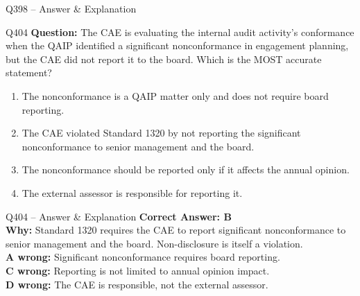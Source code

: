\documentclass[aspectratio=169,10pt]{beamer}
\begin{document}
\begin{frame}[t]{Q398 -- Answer \& Explanation}
	\begin{frame}[t]{Q404}
		\small
		\textbf{Question:} The CAE is evaluating the internal audit activity's conformance when the QAIP identified a significant nonconformance in engagement planning, but the CAE did not report it to the board. Which is the MOST accurate statement?
		\begin{enumerate}[label=\Alph*.,itemsep=1pt,topsep=2pt]
			\item The nonconformance is a QAIP matter only and does not require board reporting.
			\item The CAE violated Standard 1320 by not reporting the significant nonconformance to senior management and the board.
			\item The nonconformance should be reported only if it affects the annual opinion.
			\item The external assessor is responsible for reporting it.
		\end{enumerate}
	\end{frame}
	
	\begin{frame}[t]{Q404 -- Answer \& Explanation}
		\small
		\textbf{Correct Answer: B} \\[4pt]
		\textbf{Why:} Standard 1320 requires the CAE to report significant nonconformance to senior management and the board. Non-disclosure is itself a violation. \\[4pt]
		\textbf{A wrong:} Significant nonconformance requires board reporting. \\[2pt]
		\textbf{C wrong:} Reporting is not limited to annual opinion impact. \\[2pt]
		\textbf{D wrong:} The CAE is responsible, not the external assessor.
	\end{frame}
	

\end{frame}
\end{document}
